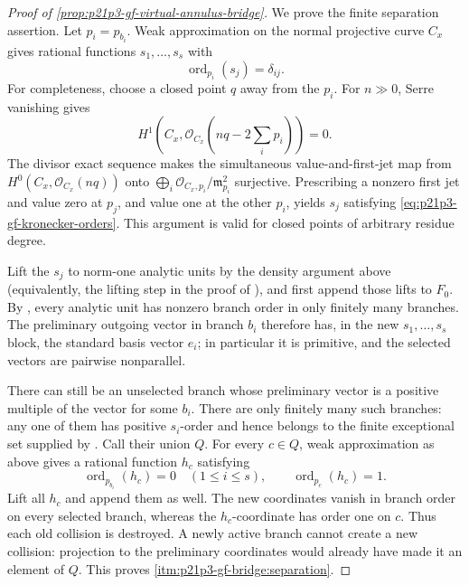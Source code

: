 \begin{proof}[Proof of
\cref{prop:p21p3-gf-virtual-annulus-bridge}]
We prove the finite separation assertion.  Let \(p_i=p_{b_i}\).  Weak
approximation on the normal projective curve \(C_x\) gives rational functions
\(s_1,\ldots,s_s\) with
\begin{equation}
\label{eq:p21p3-gf-kronecker-orders}
                \operatorname{ord}_{p_i}(s_j)=\delta_{ij}.
\end{equation}
For completeness, choose a closed point \(q\) away from the \(p_i\).  For
\(n\gg0\), Serre vanishing gives
\[
 H^1\!\left(C_x,
   \mathcal O_{C_x}\!\left(nq-2\sum_i p_i\right)\right)=0.
\]
The divisor exact sequence makes the simultaneous value-and-first-jet map
from \(H^0(C_x,\mathcal O_{C_x}(nq))\) onto
\(\bigoplus_i\mathcal O_{C_x,p_i}/\mathfrak m_{p_i}^2\) surjective.
Prescribing a nonzero first jet and value zero at \(p_j\), and value one at
the other \(p_i\), yields \(s_j\) satisfying
\eqref{eq:p21p3-gf-kronecker-orders}.  This argument is valid for closed
points of arbitrary residue degree.

Lift the \(s_j\) to norm-one analytic units by the density argument above
(equivalently, the lifting step in the proof of
\cite[Lemma~6.14]{GJR26}), and first append those lifts to \(F_0\).  By
\cite[Proposition~4.2.4(ii)]{Ducros24CurveStructure}, every
analytic unit has nonzero branch order in only finitely many branches.
The preliminary outgoing vector in branch \(b_i\) therefore has, in the new
\(s_1,\ldots,s_s\) block, the standard basis vector \(e_i\); in particular it
is primitive, and the selected vectors are pairwise nonparallel.

There can still be an unselected branch whose preliminary vector is a
positive multiple of the vector for some \(b_i\).  There are only finitely
many such branches: any one of them has positive \(s_i\)-order and hence
belongs to the finite exceptional set supplied by
\cite[Proposition~4.2.4(ii)]{Ducros24CurveStructure}.  Call their union
\(Q\).  For every \(c\in Q\), weak approximation as above gives a rational
function \(h_c\) satisfying
\begin{equation}
\label{eq:p21p3-gf-collision-killers}
 \operatorname{ord}_{p_{b_i}}(h_c)=0\quad(1\leq i\leq s),
 \qquad
 \operatorname{ord}_{p_c}(h_c)=1.
\end{equation}
Lift all \(h_c\) and append them as well.  The new coordinates vanish in
branch order on every selected branch, whereas the \(h_c\)-coordinate has
order one on \(c\).  Thus each old collision is destroyed.  A newly active
branch cannot create a new collision: projection to the preliminary
coordinates would already have made it an element of \(Q\).  This proves
\cref{itm:p21p3-gf-bridge:separation}.


\end{proof}
